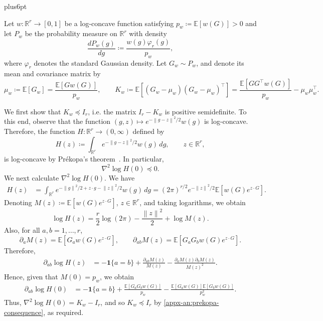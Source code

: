 \documentclass[11pt,letterpaper,twoside,leqno]{article}
\makeatletter
\theoremstyle{bookplain}
\theoremstyle{bookremark}
\renewenvironment{proof}[1][\proofname]{\par
  \pushQED{\qed}\normalfont\topsep6pt plus6pt\relax
  \trivlist\item[\hskip\labelsep\bfseries #1\@addpunct{.}]\ignorespaces
}{\popQED\endtrivlist\@endpefalse}
\newcommand{\E}{\mathbb E}
\newcommand{\R}{\mathbb R}
\newcommand{\norm}[1]{\left\lVert#1\right\rVert}
\newcommand{\dd}{\,d}
\makeatother
\begin{document}
\begin{proof}

Let \(w:\R^r\to[0,1]\) be a log-concave function
satisfying \(p_w\coloneqq\E[w(G)]>0\) and let
\(P_w\) be the probability measure on \(\R^r\) with density
\[
\frac{d P_w(g)}{dg}
\coloneqq\frac{w(g)\varphi_r(g)}{p_w},
\]
where \(\varphi_r\) denotes the standard Gaussian density.
Let \(G_w\sim P_w\), and denote its mean and covariance
matrix by
\[
\mu_w\coloneqq\E[G_w]=\frac{\E[Gw(G)]}{p_w},\qquad
K_w\coloneqq\E[(G_w-\mu_w)(G_w-\mu_w)^\top]=\frac{\E[GG^\top w(G)]}{p_w}-\mu_w\mu_w^\top.
\]

We first show that \(K_w\preceq I_r\), i.e. the matrix $I_r - K_w$ is positive semidefinite. To this end, observe that the function $(g, z)\mapsto e^{-\norm{g-z}^2/2}w(g)$
is log-concave. Therefore, the function \(H:\R^r\to(0,\infty)\) defined by
\[
H(z)\coloneqq
\int_{\R^r}e^{-\norm{g-z}^2/2}w(g)\dd g,\qquad z\in\R^r,
\]
is log-concave by Pr\'ekopa's theorem~\cite[Theorem~6]{Prekopa1973}.
In particular,
\begin{equation}\label{appx-an:prekopa-consequence}
\nabla^2\log H(0)\preceq0.
\end{equation}
We next calculate $\nabla^2\log H(0)$.
We have
\begin{align*}
H(z)
&=\int_{\R^r}
 e^{-\norm g^2/2+z\cdot g-\norm z^2/2}
 w(g)\dd g
 =(2\pi)^{r/2}e^{-\norm z^2/2}
 \E[w(G)e^{z\cdot G}].
\end{align*}
Denoting \(M(z)\coloneqq\E[w(G)e^{z\cdot G}]\), $z\in\R^r$, and taking logarithms, we obtain
\[
\log H(z)
=\frac r2\log(2\pi)-\frac{\norm z^2}{2}
 +\log M(z).
\]
Also, for all \(a, b = 1,\dots, r\),
\[
\partial_a M(z)
=\E[G_aw(G)e^{z\cdot G}],
\qquad
\partial_{ab}M(z)
=\E[G_aG_bw(G)e^{z\cdot G}].
\]
Therefore,
\begin{align*}
\partial_{ab}\log H(z)
&=-\mathbf 1\{a=b\}
 +\frac{\partial_{ab}M(z)}{M(z)}
 -\frac{\partial_aM(z)\partial_bM(z)}{M(z)^2}.
\end{align*}
Hence, given that \(M(0)=p_w\), we obtain
\begin{align*}
\partial_{ab}\log H(0)
&=-\mathbf 1\{a=b\}
 +\frac{\E[G_aG_bw(G)]}{p_w}
  -\frac{\E[G_aw(G)]\E[G_bw(G)]}{p_w^2}.
\end{align*}
Thus, $\nabla^2\log H(0)=K_w-I_r$, and so $K_w\preceq I_r$ by \eqref{appx-an:prekopa-consequence}, as required.


\end{proof}
\end{document}
